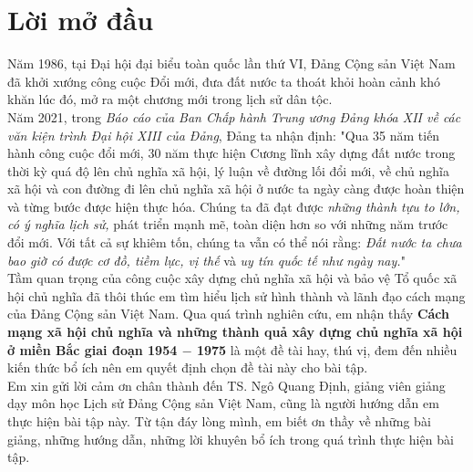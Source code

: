\section{Lời mở đầu}
Năm 1986, tại Đại hội đại biểu toàn quốc lần thứ VI, Đảng Cộng sản Việt Nam đã khởi xướng công cuộc Đổi mới, đưa đất nước ta thoát khỏi hoàn cảnh khó khăn lúc đó, mở ra một chương mới trong lịch sử dân tộc.\\
Năm 2021, trong \textit{Báo cáo của Ban Chấp hành Trung ương Đảng khóa XII về các văn kiện trình Đại hội XIII của Đảng}, Đảng ta nhận định: "Qua 35 năm tiến hành công cuộc đổi mới, 30 năm thực hiện Cương lĩnh xây dựng đất nước trong thời kỳ quá độ lên chủ nghĩa xã hội, lý luận về đường lối đổi mới, về chủ nghĩa xã hội và con đường đi lên chủ nghĩa xã hội ở nước ta ngày càng được hoàn thiện và từng bước được hiện thực hóa. Chúng ta đã đạt được \textit{những thành tựu to lớn, có ý nghĩa lịch sử,} phát triển mạnh mẽ, toàn diện hơn so với những năm trước đổi mới. Với tất cả sự khiêm tốn, chúng ta vẫn có thể nói rằng: \textit{Đất nước ta chưa bao giờ có được cơ đồ, tiềm lực, vị thế} và \textit{uy tín quốc tế như ngày nay.}" \supercite{vk13t1}\\

Tầm quan trọng của công cuộc xây dựng chủ nghĩa xã hội và bảo vệ Tổ quốc xã hội chủ nghĩa đã thôi thúc em tìm hiểu lịch sử hình thành và lãnh đạo cách mạng của Đảng Cộng sản Việt Nam. Qua quá trình nghiên cứu, em nhận thấy \textbf{Cách mạng xã hội chủ nghĩa và những thành quả xây dựng chủ nghĩa xã hội ở miền Bắc giai đoạn 1954 $\mathbf{-}$ 1975} là một đề tài hay, thú vị, đem đến nhiều kiến thức bổ ích nên em quyết định chọn đề tài này cho bài tập.\\

Em xin gửi lời cảm ơn chân thành đến TS. Ngô Quang Định, giảng viên giảng dạy môn học Lịch sử Đảng Cộng sản Việt Nam, cũng là người hướng dẫn em thực hiện bài tập này. Từ tận đáy lòng mình, em biết ơn thầy về những bài giảng, những hướng dẫn, những lời khuyên bổ ích trong quá trình thực hiện bài tập.
